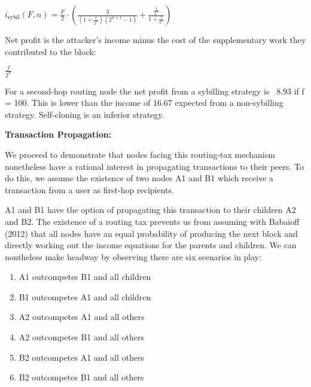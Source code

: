 \documentclass[oneside]{article}   	%
\begin{document}
\begin{multicols}{2}
\large
\begin{adjustwidth}{1.5em}{1.5em} 
	\begin{math}
i_{\text{sybil}}(F, n) = \frac{F}{2} \cdot \left(\frac{3}{\left(1+\frac{1}{2^n}\right)\left(2^{n+1}-1\right)}+\frac{\frac{1}{2^n}}{1+\frac{1}{2^n}}\right)
	\end{math}
\end{adjustwidth}
\normalsize

Net profit is the attacker's income minus the cost of the supplementary work they contributed to the block:

\large
\begin{adjustwidth}{1.5em}{1.5em}
	\begin{math}
\frac{f}{2^n}
	\end{math}
\end{adjustwidth}
\normalsize

For a second-hop routing node the net profit from a sybilling strategy is ~8.93 if f = 100. This is lower than the income of 16.67 expected from a non-sybilling strategy. Self-cloning is an inferior strategy.

\textbf{Transaction Propagation:}

We proceed to demonstrate that nodes facing this routing-tax mechanism nonetheless have a rational interest in propagating transactions to their peers. To do this, we assume the existence of two nodes A1 and B1 which receive a transaction from a user as first-hop recipients.

A1 and B1 have the option of propagating this transaction to their children A2 and B2. The existence of a routing tax prevents us from assuming with Babaioff (2012) that all nodes have an equal probability of producing the next block and directly working out the income equations for the parents and children. We can nontheless make headway by observing there are six scenarios in play:

\begin{enumerate}
  \item A1 outcompetes B1 and all children
  \item B1 outcompetes A1 and all children
  \item A2 outcompetes A1 and all others
  \item A2 outcompetes B1 and all others
  \item B2 outcompetes A1 and all others
  \item B2 outcompetes B1 and all others
\end{enumerate}


\end{multicols}
\end{document}
